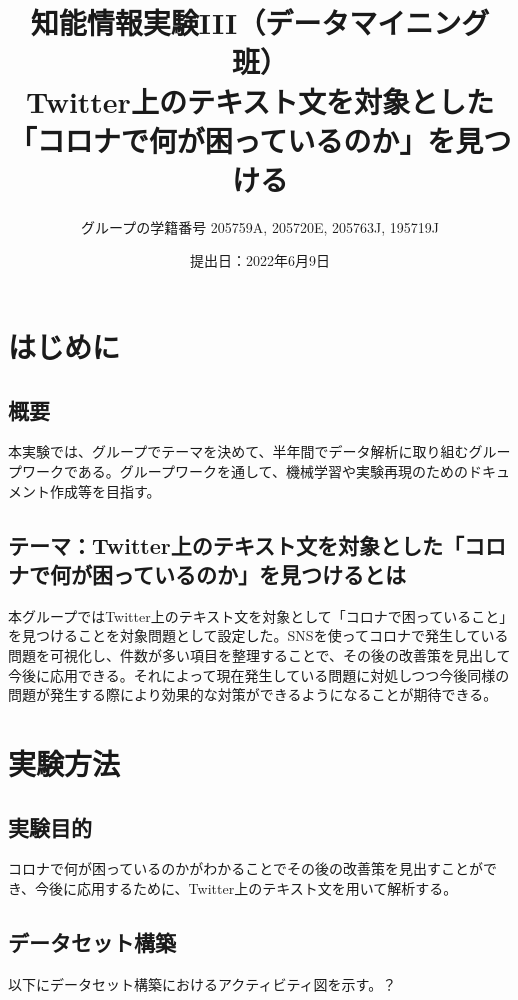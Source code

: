 \documentclass[a4paper, 11pt, titlepage]{jsarticle}
\title{知能情報実験III（データマイニング班）\\Twitter上のテキスト文を対象とした「コロナで何が困っているのか」を見つける}
\author{グループの学籍番号 205759A, 205720E, 205763J, 195719J}
\date{提出日：2022年6月9日}
\begin{document}
\maketitle
\tableofcontents
\clearpage

\section{はじめに}
\subsection{概要}
本実験では、グループでテーマを決めて、半年間でデータ解析に取り組むグループワークである。グループワークを通して、機械学習や実験再現のためのドキュメント作成等を目指す。

\subsection{テーマ：Twitter上のテキスト文を対象とした「コロナで何が困っているのか」を見つけるとは}
本グループではTwitter上のテキスト文を対象として「コロナで困っていること」を見つけることを対象問題として設定した。SNSを使ってコロナで発生している問題を可視化し、件数が多い項目を整理することで、その後の改善策を見出して今後に応用できる。それによって現在発生している問題に対処しつつ今後同様の問題が発生する際により効果的な対策ができるようになることが期待できる。

\section{実験方法}
\subsection{実験目的}
コロナで何が困っているのかがわかることでその後の改善策を見出すことができ、今後に応用するために、Twitter上のテキスト文を用いて解析する。



\subsection{データセット構築}
以下にデータセット構築におけるアクティビティ図を示す。？
\end{document}
